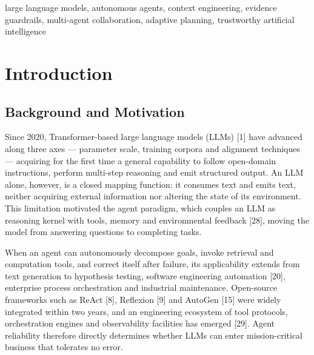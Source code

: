 \documentclass[journal,10pt,a4paper]{IEEEtran}
\begin{document}
\begin{abstract}
50\% distractor injection CGA-Agent retains 59.1\% success rate with roughly 7 points less degradation than baselines. We further delimit applicability boundaries, failure modes and deployment paths in scientific assistance, enterprise knowledge engineering and industrial operations.
\end{abstract}

\begin{IEEEkeywords}
large language models, autonomous agents, context engineering, evidence guardrails, multi-agent collaboration, adaptive planning, trustworthy artificial intelligence
\end{IEEEkeywords}

\section{Introduction}
\subsection{Background and Motivation}
Since 2020, Transformer-based large language models (LLMs) [1] have advanced along three axes --- parameter scale, training corpora and alignment techniques --- acquiring for the first time a general capability to follow open-domain instructions, perform multi-step reasoning and emit structured output. An LLM alone, however, is a closed mapping function: it consumes text and emits text, neither acquiring external information nor altering the state of its environment. This limitation motivated the agent paradigm, which couples an LLM as reasoning kernel with tools, memory and environmental feedback [28], moving the model from answering questions to completing tasks.

When an agent can autonomously decompose goals, invoke retrieval and computation tools, and correct itself after failure, its applicability extends from text generation to hypothesis testing, software engineering automation [20], enterprise process orchestration and industrial maintenance. Open-source frameworks such as ReAct [8], Reflexion [9] and AutoGen [15] were widely integrated within two years, and an engineering ecosystem of tool protocols, orchestration engines and observability facilities has emerged [29]. Agent reliability therefore directly determines whether LLMs can enter mission-critical business that tolerates no error.
\end{document}
